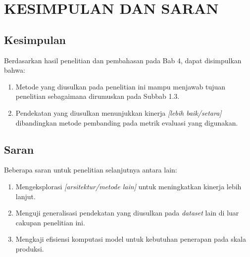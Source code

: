 \chapter{KESIMPULAN DAN SARAN}

\section{Kesimpulan}
Berdasarkan hasil penelitian dan pembahasan pada Bab 4, dapat disimpulkan bahwa:
\begin{enumerate}
    \item Metode yang diusulkan pada penelitian ini mampu menjawab tujuan penelitian sebagaimana dirumuskan pada Subbab 1.3.
    \item Pendekatan yang diusulkan menunjukkan kinerja \textit{[lebih baik/setara]} dibandingkan metode pembanding pada metrik evaluasi yang digunakan.
\end{enumerate}

\section{Saran}
Beberapa saran untuk penelitian selanjutnya antara lain:
\begin{enumerate}
    \item Mengeksplorasi \textit{[arsitektur/metode lain]} untuk meningkatkan kinerja lebih lanjut.
    \item Menguji generalisasi pendekatan yang diusulkan pada \textit{dataset} lain di luar cakupan penelitian ini.
    \item Mengkaji efisiensi komputasi model untuk kebutuhan penerapan pada skala produksi.
\end{enumerate}
